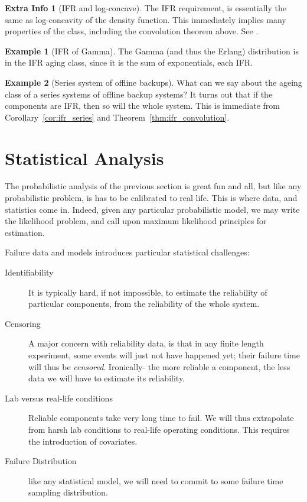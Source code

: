 \documentclass[12pt,a4paper]{report}
\theoremstyle{plain}
\theoremstyle{definition}
\newtheorem{extra}{Extra Info}
\newtheorem{example}{Example}
\begin{document}
\begin{extra}[IFR and log-concave]
The IFR requirement, is essentially the same as log-concavity of the density function.
This immediately implies many properties of the class, including the convolution theorem above.
See \cite{bagnoli_log-concave_2005}.
\end{extra}

\begin{example}[IFR of Gamma]
The Gamma (and thus the Erlang) distribution is in the IFR aging class, since it is the sum of exponentials, each IFR.
\end{example}

\begin{example}[Series system of offline backups]
What can we say about the ageing class of a series systems of offline backup systems? 
It turns out that if the components are IFR, then so will the whole system.
This is immediate from Corollary~\ref{cor:ifr_series} and Theorem~\ref{thm:ifr_convolution}.
\end{example}






\section{Statistical Analysis}
The probabilistic analysis of the previous section is great fun and all, but like any probabilistic problem, is has to be calibrated to real life. 
This is where data, and statistics come in.
Indeed, given any particular probabilistic model, we may write the likelihood problem, and call upon maximum likelihood principles for estimation.

Failure data and models introduces particular statistical challenges:
\begin{description}
\item [Identifiability] It is typically hard, if not impossible, to estimate the reliability of particular components, from the reliability of the whole system. 
\item [Censoring] A major concern with reliability data, is that in any finite length experiment, some events will just not have happened yet; their failure time will thus be \emph{censored}. Ironically- the more reliable a component, the less data we will have to estimate its reliability. 
\item [Lab versus real-life conditions] Reliable components take very long time to fail. We will thus extrapolate from harsh lab conditions to real-life operating conditions. This requires the introduction of covariates. 
\item [Failure Distribution] like any statistical model, we will need to commit to some failure time sampling distribution.
\end{description}
\end{document}
